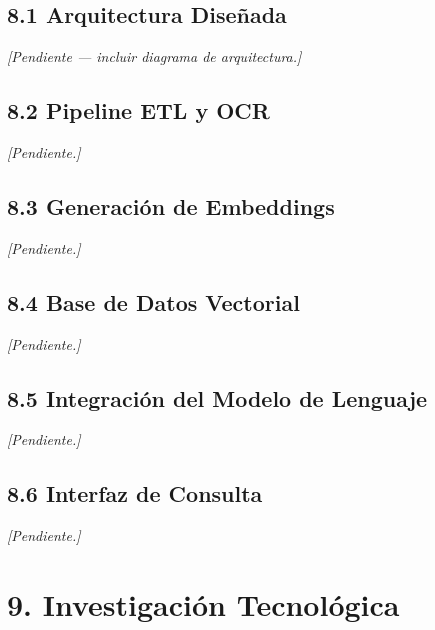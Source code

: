 \documentclass[12pt, a4paper]{report}
\begin{document}
\section*{8.1 Arquitectura Diseñada}

\textit{[Pendiente --- incluir diagrama de arquitectura.]}

\section*{8.2 Pipeline ETL y OCR}

\textit{[Pendiente.]}

\section*{8.3 Generación de Embeddings}

\textit{[Pendiente.]}

\section*{8.4 Base de Datos Vectorial}

\textit{[Pendiente.]}

\section*{8.5 Integración del Modelo de Lenguaje}

\textit{[Pendiente.]}

\section*{8.6 Interfaz de Consulta}

\textit{[Pendiente.]}

\chapter*{9. Investigación Tecnológica}
\end{document}
